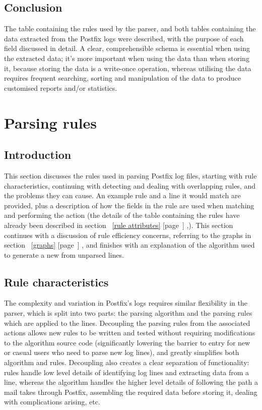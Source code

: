 \documentclass[a4paper,12pt,draft]{article}
\newcommand{\refwithpage}[1]{%
    \empty{}\ref{#1} [page~\pageref{#1}]%
}
\begin{document}
\subsection{Conclusion}

The table containing the rules used by the parser, and both tables
containing the data extracted from the Postfix logs were described, with
the purpose of each field discussed in detail.  A clear, comprehensible
schema is essential when using the extracted data; it's more important when
using the data than when storing it, because storing the data is a
write-once operation, whereas utilising the data requires frequent
searching, sorting and manipulation of the data to produce customised
reports and/or statistics.

\section{Parsing rules}

\label{rules}

\subsection{Introduction}

This section discusses the rules used in parsing Postfix log files,
starting with rule characteristics, continuing with detecting and dealing
with overlapping rules, and the problems they can cause.  An example rule
and a line it would match are provided, plus a description of how the
fields in the rule are used when matching and performing the action (the
details of the table containing the rules have already been described in
section~\refwithpage{rule attributes},).  This section continues with a
discussion of rule efficiency concerns, referring to the graphs in
section~\refwithpage{graphs}, and finishes with an explanation of the
algorithm used to generate a new \regex{} from unparsed lines.


\subsection{Rule characteristics}

\label{rule characteristics}

The complexity and variation in Postfix's logs requires similar flexibility
in the parser, which is split into two parts: the parsing algorithm and the
parsing rules which are applied to the lines.  Decoupling the parsing rules
from the associated actions allows new rules to be written and tested
without requiring modifications to the algorithm source code (significantly
lowering the barrier to entry for new or casual users who need to parse new
log lines), and greatly simplifies both algorithm and rules.  Decoupling
also creates a clear separation of functionality: rules handle low level
details of identifying log lines and extracting data from a line, whereas
the algorithm handles the higher level details of following the path a mail
takes through Postfix, assembling the required data before storing it,
dealing with complications arising, etc.
\end{document}

